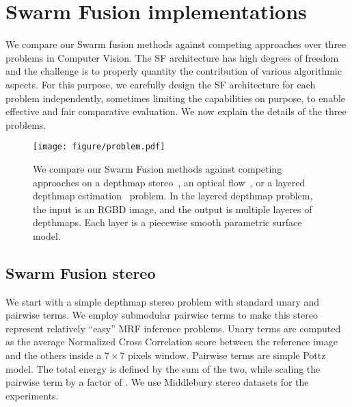\section{Swarm Fusion implementations }
We compare our Swarm fusion methods against competing approaches over
three problems in Computer Vision. The SF architecture has high degrees
of freedom and the challenge is to properly quantity the contribution of
various algorithmic aspects. For this purpose, we carefully design the
SF architecture for each problem independently, sometimes limiting the
capabilities on purpose, to enable effective and fair comparative
evaluation.  We now explain the details of the three problems.

%
\begin{figure}[tb]
 \texttt{[image: figure/problem.pdf]} \caption{We
 compare our Swarm Fusion methods against competing approaches on a
 depthmap stereo~\cite{middle_bury_stereo}, an optical
 flow~\cite{middlebury_optical_flow}, or a layered depthmap
 estimation~\cite{layered_depthmap} problem. In the layered depthmap
 problem, the input is an RGBD image, and the output is multiple layeres
 of depthmaps. Each layer is a piecewise smooth parametric surface
 model.}\label{fig:problem}
\end{figure}



\subsection{Swarm Fusion stereo}
We start with a simple depthmap stereo problem with standard unary and
pairwise terms. We employ submodular pairwise terms to make this stereo
represent relatively ``easy'' MRF inference problems.
%
Unary terms are computed as the average Normalized Cross Correlation
score between the reference image and the others inside a $7\times 7$
pixels window. Pairwise terms are simple Pottz model. The total energy
is defined by the sum of the two, while scaling the pairwise term by a
factor of .
%
We use Middlebury stereo datasets for the experiments.

